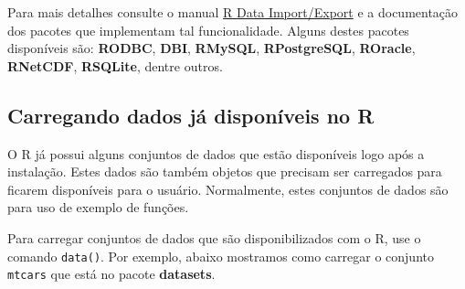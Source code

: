 \documentclass[
  10pt,
  a4paper]{book}
\begin{document}
Para mais detalhes consulte o manual \href{http://cran-r.c3sl.ufpr.br/doc/manuals/r-release/R-data.html}{R Data Import/Export} e a
documentação dos pacotes que implementam tal funcionalidade. Alguns
destes pacotes disponíveis são: \textbf{RODBC}, \textbf{DBI}, \textbf{RMySQL},
\textbf{RPostgreSQL}, \textbf{ROracle}, \textbf{RNetCDF}, \textbf{RSQLite}, dentre outros.

\hypertarget{carregando-dados-juxe1-disponuxedveis-no-r}{%
\subsection{Carregando dados já disponíveis no R}\label{carregando-dados-juxe1-disponuxedveis-no-r}}

O R já possui alguns conjuntos de dados que estão disponíveis logo após a
instalação. Estes dados são também objetos que precisam ser carregados
para ficarem disponíveis para o usuário. Normalmente, estes conjuntos de
dados são para uso de exemplo de funções.

Para carregar conjuntos de dados que são disponibilizados com o R, use
o comando \texttt{data()}. Por exemplo, abaixo mostramos como carregar o conjunto
\texttt{mtcars} que está no pacote \textbf{datasets}.
\end{document}
